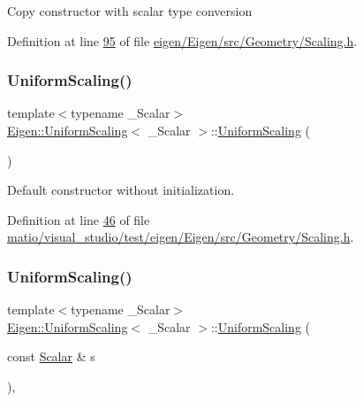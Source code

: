 Copy constructor with scalar type conversion 

Definition at line \hyperlink{eigen_2_eigen_2src_2_geometry_2_scaling_8h_source_l00095}{95} of file \hyperlink{eigen_2_eigen_2src_2_geometry_2_scaling_8h_source}{eigen/\+Eigen/src/\+Geometry/\+Scaling.\+h}.

\mbox{\label{class_eigen_1_1_uniform_scaling_ab17e233af501c69ff47c0dd16f43cc39}} 
\subsubsection{\texorpdfstring{Uniform\+Scaling()}{UniformScaling()}\hspace{0.1cm}{\footnotesize\ttfamily [4/6]}}
{\footnotesize\ttfamily template$<$typename \+\_\+\+Scalar$>$ \\
\hyperlink{class_eigen_1_1_uniform_scaling}{Eigen\+::\+Uniform\+Scaling}$<$ \+\_\+\+Scalar $>$\+::\hyperlink{class_eigen_1_1_uniform_scaling}{Uniform\+Scaling} (\begin{DoxyParamCaption}{ }\end{DoxyParamCaption})\hspace{0.3cm}{\ttfamily [inline]}}

Default constructor without initialization. 

Definition at line \hyperlink{matio_2visual__studio_2test_2eigen_2_eigen_2src_2_geometry_2_scaling_8h_source_l00046}{46} of file \hyperlink{matio_2visual__studio_2test_2eigen_2_eigen_2src_2_geometry_2_scaling_8h_source}{matio/visual\+\_\+studio/test/eigen/\+Eigen/src/\+Geometry/\+Scaling.\+h}.

\mbox{\label{class_eigen_1_1_uniform_scaling_a3a3e2fa318eb29c2c4f87e23a8a75144}} 
\subsubsection{\texorpdfstring{Uniform\+Scaling()}{UniformScaling()}\hspace{0.1cm}{\footnotesize\ttfamily [5/6]}}
{\footnotesize\ttfamily template$<$typename \+\_\+\+Scalar$>$ \\
\hyperlink{class_eigen_1_1_uniform_scaling}{Eigen\+::\+Uniform\+Scaling}$<$ \+\_\+\+Scalar $>$\+::\hyperlink{class_eigen_1_1_uniform_scaling}{Uniform\+Scaling} (\begin{DoxyParamCaption}\item[{const \hyperlink{class_eigen_1_1_uniform_scaling_a04c4339f58f1210c5d4d34b1bd7ae283}{Scalar} \&}]{s }\end{DoxyParamCaption})\hspace{0.3cm}{\ttfamily [inline]}, {\ttfamily [explicit]}}

